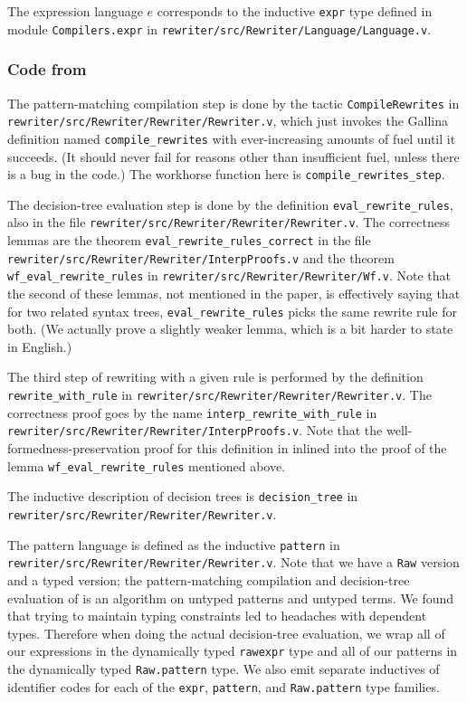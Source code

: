 \begin{subappendices}
The expression language $e$ corresponds to the inductive \texttt{expr} type defined in module \texttt{Compilers.expr} in \texttt{rewriter/src/Rewriter/Language/Language.v}.

\subsubsection{Code from }

The pattern-matching compilation step is done by the tactic \texttt{CompileRewrites} in \texttt{rewriter/src/Rewriter/Rewriter/Rewriter.v}, which just invokes the Gallina definition named \texttt{compile\_rewrites} with ever-increasing amounts of fuel until it succeeds.
(It should never fail for reasons other than insufficient fuel, unless there is a bug in the code.)
The workhorse function here is \texttt{compile\_rewrites\_step}.

The decision-tree evaluation step is done by the definition \texttt{eval\_rewrite\_rules}, also in the file \texttt{rewriter/src/Rewriter/Rewriter/Rewriter.v}.
The correctness lemmas are the theorem \texttt{eval\_rewrite\_rules\_correct} in the file \texttt{rewriter/src/Rewriter/Rewriter/InterpProofs.v} and the theorem \texttt{wf\_eval\_rewrite\_rules} in \texttt{rewriter/src/Rewriter/Rewriter/Wf.v}.
Note that the second of these lemmas, not mentioned in the paper, is effectively saying that for two related syntax trees, \texttt{eval\_rewrite\_rules} picks the same rewrite rule for both.
(We actually prove a slightly weaker lemma, which is a bit harder to state in English.)

The third step of rewriting with a given rule is performed by the definition \texttt{rewrite\_with\_rule} in \texttt{rewriter/src/Rewriter/Rewriter/Rewriter.v}.
The correctness proof goes by the name \texttt{interp\_rewrite\_with\_rule} in \texttt{rewriter/src/Rewriter/Rewriter/InterpProofs.v}.
Note that the well-formedness-preservation proof for this definition in inlined into the proof of the lemma \verb|wf_eval_rewrite_rules| mentioned above.

The inductive description of decision trees is \verb|decision_tree| in \texttt{rewriter/src/Rewriter/Rewriter/Rewriter.v}.

The pattern language is defined as the inductive \verb|pattern| in \texttt{rewriter/src/Rewriter/Rewriter/Rewriter.v}.
Note that we have a \verb|Raw| version and a typed version; the pattern-matching compilation and decision-tree evaluation of \textcite{Aehlig} is an algorithm on untyped patterns and untyped terms.
We found that trying to maintain typing constraints led to headaches with dependent types.
Therefore when doing the actual decision-tree evaluation, we wrap all of our expressions in the dynamically typed \verb|rawexpr| type and all of our patterns in the dynamically typed \verb|Raw.pattern| type.
We also emit separate inductives of identifier codes for each of the \verb|expr|, \verb|pattern|, and \verb|Raw.pattern| type families.


\end{subappendices}
